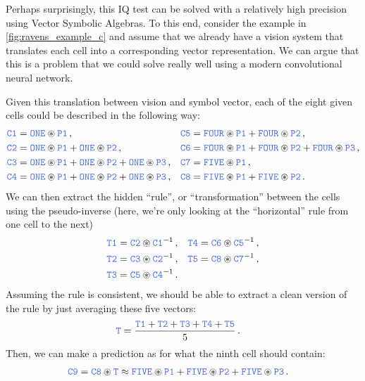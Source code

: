 \documentclass[10pt,letterpaper,oneside]{article}
\begin{document}
Perhaps surprisingly, this IQ test can be solved with a relatively high precision using Vector Symbolic Algebras. To this end, consider the example in \cref{fig:ravens_example_c} and assume that we already have a vision system that translates each cell into a corresponding vector representation. We can argue that this is a problem that we could solve really well using a modern convolutional neural network.

Given this translation between vision and symbol vector, each of the eight given cells could be described in the following way:
\begin{align*}
	\Obj{C1} &= \Obj{ONE}  \CC \Obj{P1}                                                       \,, &
	\Obj{C5} &= \Obj{FOUR} \CC \Obj{P1} + \Obj{FOUR} \CC \Obj{P2}                             \,, \\
	\Obj{C2} &= \Obj{ONE}  \CC \Obj{P1} + \Obj{ONE}  \CC \Obj{P2}                             \,, &
	\Obj{C6} &= \Obj{FOUR} \CC \Obj{P1} + \Obj{FOUR} \CC \Obj{P2} + \Obj{FOUR} \CC \Obj{P3}   \,, \\
	\Obj{C3} &= \Obj{ONE}  \CC \Obj{P1} + \Obj{ONE}  \CC \Obj{P2} + \Obj{ONE}  \CC \Obj{P3}   \,, &
	\Obj{C7} &= \Obj{FIVE} \CC \Obj{P1}                                                       \,, \\
	\Obj{C4} &= \Obj{ONE}  \CC \Obj{P1} + \Obj{ONE}  \CC \Obj{P2} + \Obj{ONE}  \CC \Obj{P3}   \,, &
	\Obj{C8} &= \Obj{FIVE} \CC \Obj{P1} + \Obj{FIVE} \CC \Obj{P2}                             \,.
\end{align*}
We can then extract the hidden \enquote{rule}, or \enquote{transformation} between the cells using the pseudo-inverse (here, we're only looking at the \enquote{horizontal} rule from one cell to the next)
\begin{align*}
	\Obj{T1} &= \Obj{C2} \CC \Obj{C1}^{-1} \,, &
	\Obj{T4} &= \Obj{C6} \CC \Obj{C5}^{-1} \,, \\
	\Obj{T2} &= \Obj{C3} \CC \Obj{C2}^{-1} \,, &
	\Obj{T5} &= \Obj{C8} \CC \Obj{C7}^{-1} \,, \\
	\Obj{T3} &= \Obj{C5} \CC \Obj{C4}^{-1} \,.
\end{align*}
Assuming the rule is consistent, we should be able to extract a clean version of the rule by just averaging these five vectors:
\begin{align*}
	\Obj{T} &= \frac{\Obj{T1} + \Obj{T2} + \Obj{T3} + \Obj{T4} + \Obj{T5}}5 \,.
\end{align*}
Then, we can make a prediction as for what the ninth cell should contain:
\begin{align*}
	\Obj{C9} &= \Obj{C8} \CC \Obj{T} \approx \Obj{FIVE}  \CC \Obj{P1} + \Obj{FIVE}  \CC \Obj{P2} + \Obj{FIVE}  \CC \Obj{P3} \,.
\end{align*}
\pagebreak
{}
\end{document}
